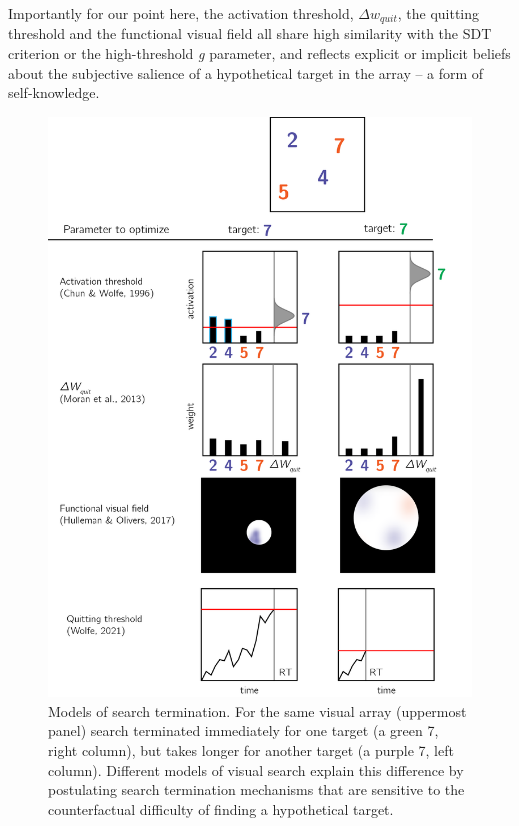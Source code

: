\documentclass[12pt,twoside]{reedthesis}
\begin{document}
Importantly for our point here, the activation threshold, \(\Delta w_{quit}\), the quitting threshold and the functional visual field all share high similarity with the SDT criterion or the high-threshold \emph{g} parameter, and reflects explicit or implicit beliefs about the subjective salience of a hypothetical target in the array -- a form of self-knowledge.
\begin{figure}
\includegraphics[width=1\linewidth]{figure/intro/termination_models} \caption[Models of search termination]{Models of search termination. For the same visual array (uppermost panel) search terminated immediately for one target (a green 7, right column), but takes longer for another target (a purple 7, left column). Different models of visual search explain this difference by postulating search termination mechanisms that are sensitive to the counterfactual difficulty of finding a hypothetical target.}\label{fig:intro-termination-models}
\end{figure}
\end{document}

